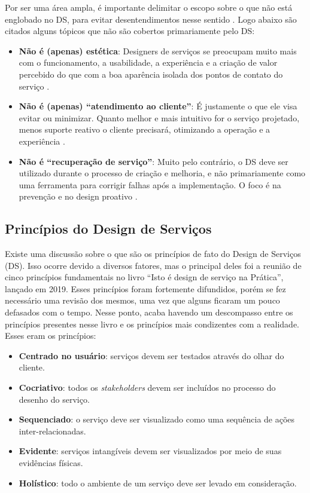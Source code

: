 Por ser uma área ampla, é importante delimitar o escopo sobre o que não está englobado no DS, para evitar desentendimentos nesse sentido \cite{Polaine2013Orange}. Logo abaixo são citados alguns tópicos que não são cobertos primariamente pelo DS:

\begin{itemize}
	\item \textbf{Não é (apenas) estética}: Designers de serviços se preocupam muito mais com o funcionamento, a usabilidade, a experiência e a criação de valor percebido do que com a boa aparência isolada dos pontos de contato do serviço \cite{Polaine2013Orange}.
	
	\item \textbf{Não é (apenas) ``atendimento ao cliente''}: É justamente o que ele visa evitar ou minimizar. Quanto melhor e mais intuitivo for o serviço projetado, menos suporte reativo o cliente precisará, otimizando a operação e a experiência \cite{Stickdorn2019}.
	
	\item \textbf{Não é ``recuperação de serviço''}: Muito pelo contrário, o DS deve ser utilizado durante o processo de criação e melhoria, e não primariamente como uma ferramenta para corrigir falhas após a implementação. O foco é na prevenção e no design proativo \cite{Patricio2011Multilevel}.
\end{itemize}


\subsection{Princípios do Design de Serviços}

Existe uma discussão sobre o que são os princípios de fato do Design de Serviços (DS). Isso ocorre devido a diversos fatores, mas o principal deles foi a reunião de cinco princípios fundamentais no livro ``Isto é design de serviço na Prática'', lançado em 2019. Esses princípios foram fortemente difundidos, porém se fez necessário uma revisão dos mesmos, uma vez que alguns ficaram um pouco defasados com o tempo. Nesse ponto, acaba havendo um descompasso entre os princípios presentes nesse livro e os princípios mais condizentes com a realidade. Esses eram os princípios:

\begin{itemize}
	\item \textbf{Centrado no usuário}: serviços devem ser testados através do olhar do cliente.
	\item \textbf{Cocriativo}: todos os \textit{stakeholders} devem ser incluídos no processo do desenho do serviço.
	\item \textbf{Sequenciado}: o serviço deve ser visualizado como uma sequência de ações inter-relacionadas.
	\item \textbf{Evidente}: serviços intangíveis devem ser visualizados por meio de suas evidências físicas.
	\item \textbf{Holístico}: todo o ambiente de um serviço deve ser levado em consideração.
\end{itemize}

